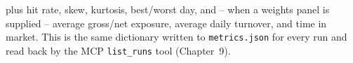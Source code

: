 plus hit rate, skew, kurtosis, best/worst day, and -- when a weights panel is
supplied -- average gross/net exposure, average daily turnover, and time in
market. This is the same dictionary written to \texttt{metrics.json} for every
run and read back by the MCP \texttt{list\_runs} tool (Chapter~9).
